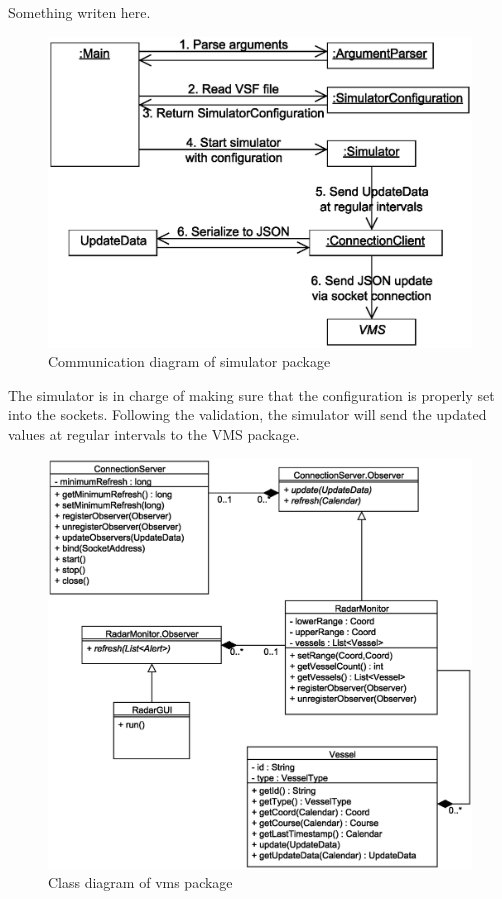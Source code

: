 \documentclass{article}
\begin{document}
Something writen here.

\begin{figure}[h]
\caption{Communication diagram of simulator package}
\includegraphics[width=\linewidth]{diagrams/simulator-communication-diagram.eps}
\end{figure}

The simulator is in charge of making sure that the configuration is properly set into the sockets. Following the validation, the simulator will send the updated values at regular intervals to the VMS package.

\begin{figure}[h]	
\caption{Class diagram of vms package}
\includegraphics[width=\linewidth]{diagrams/vms-class-diagram.eps}
\end{figure}
\end{document}
